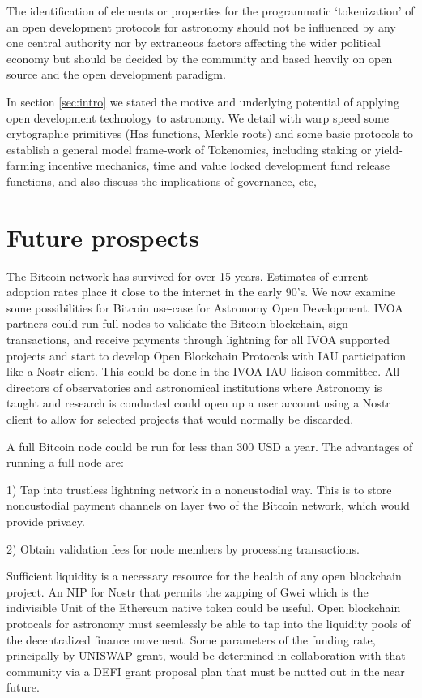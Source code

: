 \documentclass[final,5p,times,twocolumn,authoryear]{elsarticle}
\begin{document}
The identification of elements or properties for the programmatic `tokenization' of an open development protocols for astronomy should not be influenced by any one central authority nor by extraneous factors affecting the wider political economy but should be decided by the community and based heavily on open source and the open development paradigm. 
   
In section \ref{sec:intro} we stated the motive and underlying potential of applying open development technology to astronomy. We detail with warp speed some crytographic primitives (Has functions, Merkle roots) and some basic protocols to establish a general model frame-work of Tokenomics, including staking or yield-farming incentive mechanics, time and value locked development fund release functions, and also discuss the implications of governance, etc,

\section{Future prospects}
\label{sec:use-case}

The Bitcoin network has survived for over 15 years. Estimates of current adoption rates place it close to the internet in the early 90's. We now examine some possibilities for Bitcoin use-case for Astronomy Open Development. IVOA partners could run full nodes to validate the Bitcoin blockchain, sign transactions, and receive payments through lightning for all IVOA supported projects and start to develop Open Blockchain Protocols with IAU participation like a Nostr client. This could be done in the IVOA-IAU liaison committee. All directors of observatories and astronomical institutions where Astronomy is taught and research is conducted could open up a user account using a Nostr client to allow for selected projects that would normally be discarded. 

A full Bitcoin node could be run for less than 300 USD a year. The advantages of running a full node are:

1) Tap into trustless lightning network in a noncustodial way. This is to store noncustodial payment channels on layer two of the Bitcoin network, which would provide privacy. 

2) Obtain validation fees for node members by processing transactions.


Sufficient liquidity is a necessary resource for the health of any open blockchain project. An NIP for Nostr that permits the zapping of Gwei which is the indivisible Unit of the Ethereum native token could be useful. Open blockchain protocals for astronomy must seemlessly be able to tap into the liquidity pools of the decentralized finance movement. Some parameters of the funding rate, principally by UNISWAP grant, would be determined in collaboration with that community via a DEFI grant proposal plan that must be nutted out in the near future.   
\end{document}
